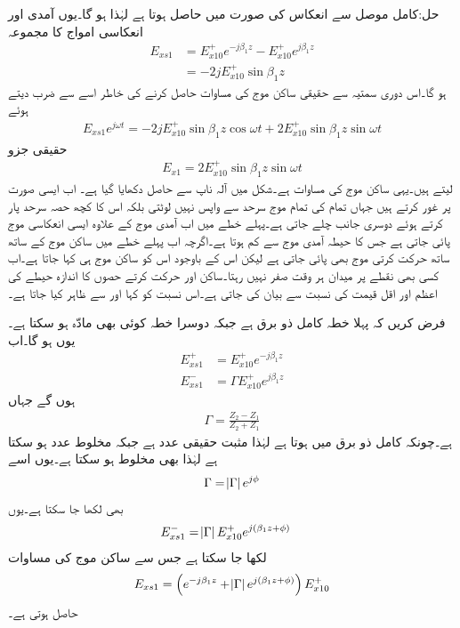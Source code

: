 حل:کامل موصل سے انعکاس کی صورت میں  حاصل ہوتا ہے  لہٰذا  ہو گا۔یوں آمدی اور انعکاسی امواج کا مجموعہ
\begin{align*}
E_{xs1}&=E_{x10}^+ e^{-j \beta_1 z} -E_{x10}^+ e^{j \beta_1 z}\\
&=-2 j E_{x10}^+ \sin \beta_1 z
\end{align*}
ہو گا۔اس دوری سمتیہ سے حقیقی ساکن موج کی مساوات حاصل کرنے کی خاطر اسے  سے ضرب دیتے ہوئے
\begin{align*}
E_{xs1} e^{j\omega t}=-2 j E_{x10}^+ \sin \beta_1 z \cos \omega t +2 E_{x10}^+ \sin \beta_1 z \sin \omega t
\end{align*}
 حقیقی جزو
\begin{align*}
E_{x1}=2 E_{x10}^+ \sin \beta_1 z \sin \omega t
\end{align*}
 لیتے ہیں۔یہی ساکن موج کی مساوات ہے۔شکل  میں آلہ ناپ سے حاصل  دکھایا گیا ہے۔
اب ایسی صورت پر غور کرتے ہیں جہاں تمام کی تمام موج سرحد سے واپس نہیں لوٹتی بلکہ اس کا کچھ حصہ سرحد پار کرتے ہوئے دوسری جانب چلے جاتی ہے۔پہلے خطے میں اب آمدی موج کے علاوہ ایسی انعکاسی موج پائی جاتی ہے جس کا حیطہ آمدی موج سے کم ہوتا ہے۔اگرچہ اب پہلے خطے میں ساکن موج کے ساتھ ساتھ حرکت  کرتی موج بھی پائی جاتی ہے لیکن اس کے باوجود اس کو ساکن موج ہی کہا جاتا ہے۔اب کسی بھی نقطے پر میدان ہر وقت صفر نہیں رہتا۔ساکن اور حرکت کرتے حصوں کا اندازہ حیطے کی اعظم  اور اقل قیمت کی نسبت سے بیان کی جاتی ہے۔اس نسبت  کو  کہا اور  سے ظاہر کیا جاتا ہے۔ 

فرض کریں کہ پہلا خطہ کامل ذو برق ہے جبکہ دوسرا خطہ کوئی بھی مادّہ ہو سکتا ہے۔یوں  ہو گا۔اب
\begin{align*}
E_{xs1}^+&=E_{x10}^+ e^{-j\beta_1 z}\\
E_{xs1}^-&=\Gamma E_{x10}^+ e^{j\beta_1 z}
\end{align*}
ہوں گے جہاں
\begin{align*}
\Gamma=\frac{Z_2-Z_1}{Z_2+Z_1}
\end{align*}
ہے۔چونکہ کامل ذو برق میں  ہوتا ہے لہٰذا  مثبت حقیقی عدد ہے جبکہ  مخلوط عدد ہو سکتا ہے لہٰذا  بھی مخلوط ہو سکتا ہے۔یوں اسے
\begin{align*}
\Gamma=\abs{\Gamma}e^{j \phi}
\end{align*}
بھی لکھا جا سکتا ہے۔یوں
\begin{align*}
E_{xs1}^-&=\abs{\Gamma} E_{x10}^+ e^{j(\beta_1 z+\phi)}
\end{align*}
لکھا جا سکتا ہے جس سے ساکن موج کی مساوات
\begin{align}\label{مساوات_موج_ساکن_مخلوط_موج}
E_{xs1}=\left(e^{-j\beta_1 z}+\abs{\Gamma} e^{j(\beta_1z +\phi)} \right) E_{x10}^+
\end{align}
حاصل ہوتی ہے۔


